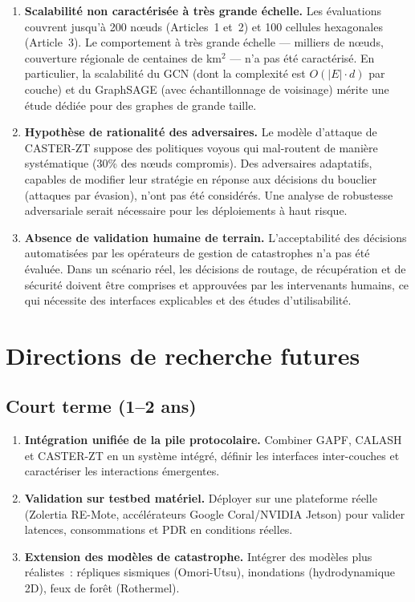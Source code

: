 \begin{enumerate}
    \item \textbf{Scalabilité non caractérisée à très grande échelle.} Les évaluations couvrent jusqu'à 200 n\oe{}uds (Articles~1 et~2) et 100 cellules hexagonales (Article~3). Le comportement à très grande échelle --- milliers de n\oe{}uds, couverture régionale de centaines de km$^2$ --- n'a pas été caractérisé. En particulier, la scalabilité du GCN (dont la complexité est $O(|E| \cdot d)$ par couche) et du GraphSAGE (avec échantillonnage de voisinage) mérite une étude dédiée pour des graphes de grande taille.

    \item \textbf{Hypothèse de rationalité des adversaires.} Le modèle d'attaque de CASTER-ZT suppose des politiques voyous qui mal-routent de manière systématique (30\% des n\oe{}uds compromis). Des adversaires adaptatifs, capables de modifier leur stratégie en réponse aux décisions du bouclier (attaques par évasion), n'ont pas été considérés. Une analyse de robustesse adversariale serait nécessaire pour les déploiements à haut risque.

    \item \textbf{Absence de validation humaine de terrain.} L'acceptabilité des décisions automatisées par les opérateurs de gestion de catastrophes n'a pas été évaluée. Dans un scénario réel, les décisions de routage, de récupération et de sécurité doivent être comprises et approuvées par les intervenants humains, ce qui nécessite des interfaces explicables et des études d'utilisabilité.
\end{enumerate}

\section{Directions de recherche futures}\label{sec:concl-futures}

\subsection{Court terme (1--2 ans)}

\begin{enumerate}
    \item \textbf{Intégration unifiée de la pile protocolaire.} Combiner GAPF, CALASH et CASTER-ZT en un système intégré, définir les interfaces inter-couches et caractériser les interactions émergentes.
    \item \textbf{Validation sur testbed matériel.} Déployer sur une plateforme réelle (Zolertia RE-Mote, accélérateurs Google Coral/NVIDIA Jetson) pour valider latences, consommations et PDR en conditions réelles.
    \item \textbf{Extension des modèles de catastrophe.} Intégrer des modèles plus réalistes~: répliques sismiques (Omori-Utsu), inondations (hydrodynamique 2D), feux de forêt (Rothermel).
\end{enumerate}

